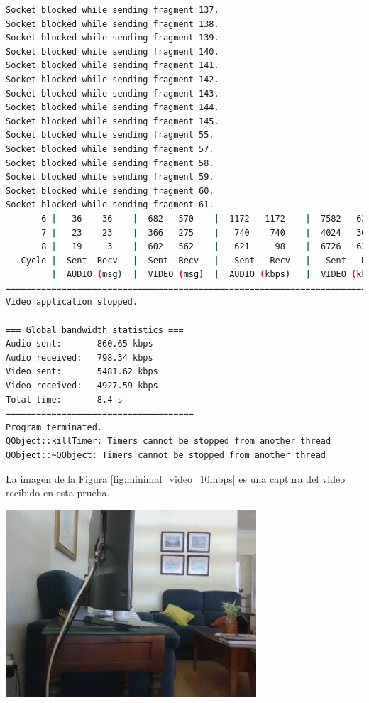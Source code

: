 \begin{lstlisting}[language=bash,basicstyle=\ttfamily\tiny]
Socket blocked while sending fragment 137.
Socket blocked while sending fragment 138.
Socket blocked while sending fragment 139.
Socket blocked while sending fragment 140.
Socket blocked while sending fragment 141.
Socket blocked while sending fragment 142.
Socket blocked while sending fragment 143.
Socket blocked while sending fragment 144.
Socket blocked while sending fragment 145.
Socket blocked while sending fragment 55.
Socket blocked while sending fragment 57.
Socket blocked while sending fragment 58.
Socket blocked while sending fragment 59.
Socket blocked while sending fragment 60.
Socket blocked while sending fragment 61.
       6 |   36    36    |  682   570    |  1172   1172    |  7582   6338    |  33     70       
       7 |   23    23    |  366   275    |   740    740    |  4024   3025    |  33     50       
       8 |   19     3    |  602   562    |   621     98    |  6726   6280    |  13     72       
   Cycle |  Sent  Recv   |  Sent  Recv   |   Sent   Recv   |   Sent   Recv   | Program System
         |  AUDIO (msg)  |  VIDEO (msg)  |  AUDIO (kbps)   |  VIDEO (kbps)   |     CPU (%) 
===========================================================================================
Video application stopped.

=== Global bandwidth statistics ===
Audio sent:       860.65 kbps
Audio received:   798.34 kbps
Video sent:       5481.62 kbps
Video received:   4927.59 kbps
Total time:       8.4 s
=====================================
Program terminated.
QObject::killTimer: Timers cannot be stopped from another thread
QObject::~QObject: Timers cannot be stopped from another thread
\end{lstlisting}
\vspace{\baselineskip}

La imagen de la Figura \ref{fig:minimal_video_10mbps} es una captura del vídeo recibido en esta prueba.
\begin{center}
  \includegraphics[width = 0.7\textwidth]{images/VideoRecibido2.1.png}
  \label{fig:minimal_video_10mbps}
\end{center}

